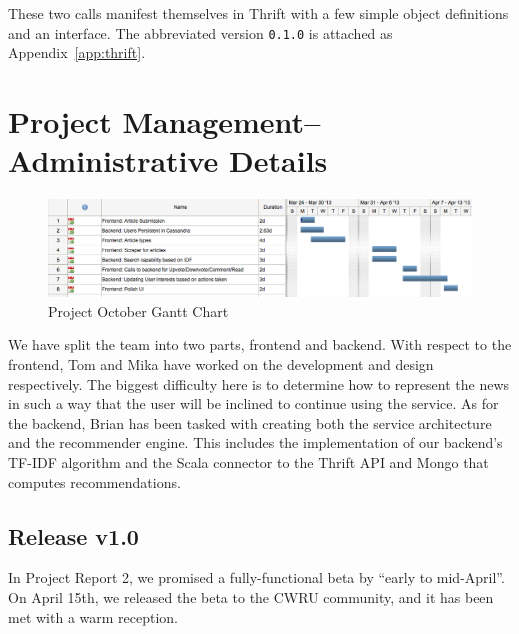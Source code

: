 \documentclass[11pt,letterpaper]{article}
\begin{document}
These two calls manifest themselves in Thrift with a few simple object
definitions and an interface.  The abbreviated version \texttt{0.1.0} is
attached as Appendix~\ref{app:thrift}.

\section{Project Management--Administrative Details}

\begin{figure}
\centering
\includegraphics[scale=0.45]{img/octoborg-gantt.png}
\caption{Project October Gantt Chart}
\label{fig:gantt}
\end{figure}

We have split the team into two parts, frontend and backend.
With respect to the frontend, Tom and Mika have worked on the development and design respectively.
The biggest difficulty here is to determine how to represent the news in such a way that the user will be inclined to continue using the service.
As for the backend, Brian has been tasked with creating both the service architecture and the recommender engine.
This includes the implementation of our backend's TF-IDF algorithm and the Scala connector to the Thrift API and Mongo that computes recommendations.

\subsection{Release v1.0}
\label{sec:release1.0}
In Project Report 2, we promised a fully-functional beta by ``early to mid-April''.
On April 15th, we released the beta to the CWRU community, and it has been met with a warm reception.
\end{document}
